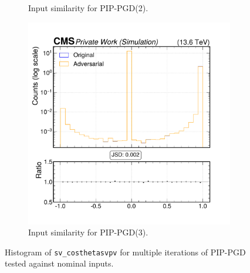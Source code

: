 \begin{figure}[htbp]
\begin{subfigure}[t]{0.32\textwidth}
    \caption*{Input similarity for PIP-PGD(2).}
  \end{subfigure}\hfill
  \begin{subfigure}[t]{0.32\textwidth}
    \includegraphics[width=\linewidth]{media/output/features/compare/combined_it_3/cmp_vtx_arr_sv_costhetasvpv.pdf}
    \caption*{Input similarity for PIP-PGD(3).}
  \end{subfigure}

  \caption*{Histogram of \texttt{sv\_costhetasvpv} for multiple iterations of PIP-PGD tested against nominal inputs.}
  \label{fig:combined_input_sv_costhetasvpv}
\end{figure}

